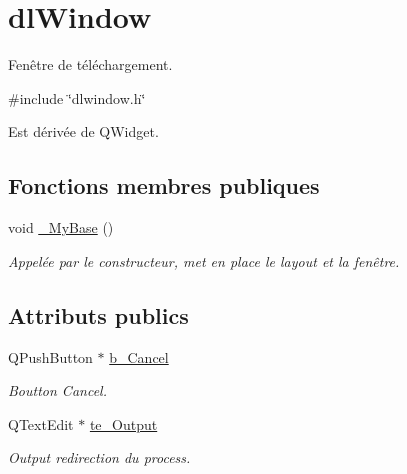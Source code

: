 \hypertarget{classdlWindow}{}\section{dl\+Window}
\label{classdlWindow}


Fenêtre de téléchargement.  




{\ttfamily \#include \char`\"{}dlwindow.\+h\char`\"{}}



Est dérivée de Q\+Widget.

\subsection*{Fonctions membres publiques}
\begin{DoxyCompactItemize}
\item 
\mbox{\label{classdlWindow_a1ebe96a8060872f44d9c1b7690c9abc1}} 
void \hyperlink{classdlWindow_a1ebe96a8060872f44d9c1b7690c9abc1}{\+\_\+\+My\+Base} ()
\begin{DoxyCompactList}\small\item\em Appelée par le constructeur, met en place le layout et la fenêtre. \end{DoxyCompactList}\end{DoxyCompactItemize}
\subsection*{Attributs publics}
\begin{DoxyCompactItemize}
\item 
\mbox{\label{classdlWindow_ab8895c8c6006153e37f32d0b505d5451}} 
Q\+Push\+Button $\ast$ \hyperlink{classdlWindow_ab8895c8c6006153e37f32d0b505d5451}{b\+\_\+\+Cancel}
\begin{DoxyCompactList}\small\item\em Boutton Cancel. \end{DoxyCompactList}\item 
Q\+Text\+Edit $\ast$ \hyperlink{classdlWindow_a535fc30f750e2969928630165600d8cc}{te\+\_\+\+Output}
\begin{DoxyCompactList}\small\item\em Output redirection du process. \end{DoxyCompactList}\end{DoxyCompactItemize}
